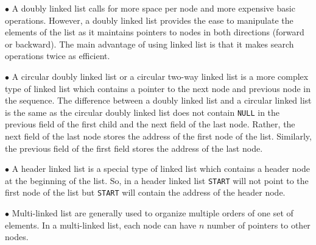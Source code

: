\vskip 3mm
$\bullet$ A doubly linked list calls for more space per node and more expensive basic operations. However, a doubly linked list provides the ease to manipulate the elements of the list as it maintains pointers to nodes in both directions (forward or backward). The main advantage of using linked list is that it makes search operations twice as efficient.

\vskip 3mm
$\bullet$ A circular doubly linked list or a circular two-way linked list is a more complex type of linked list which contains a pointer to the next node and previous node in the sequence. The difference between a doubly linked list and a circular linked list is the same as the circular doubly linked list does not contain {\tt NULL} in the previous field of the first child and the next field of the last node. Rather, the next field of the last node stores the address of the first node of the list. Similarly, the previous field of the first field stores the address of the last node.

\vskip 3mm
$\bullet$ A header linked list is a special type of linked list which contains a header node at the beginning of the list. So, in a header linked list {\tt START} will not point to the first node of the list but {\tt START} will contain the address of the header node.

\vskip 3mm
$\bullet$ Multi-linked list are generally used to organize multiple orders of one set of elements. In a multi-linked list, each node can have $n$ number of pointers to other nodes.


\filbreak
\vfill\eject
\bye
